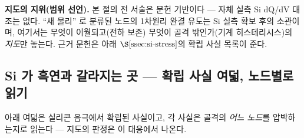 \begin{bgbox}
\textbf{지도의 지위(범위 선언).} 본 절의 전 서술은 문헌 기반이다 --- 자체 실측 Si dQ/dV 대조는 없다.
``새 물리'' 로 분류된 노드의 1차원리 완결 유도는 Si 실측 확보 후의 소관이며, 여기서는 무엇이
이월되고(전하 보존) 무엇이 골격 밖인가(기계 히스테리시스)의 \emph{지도}만 놓는다. 근거 문헌은 아래
$\S\ref{ssec:si-stress}$의 확립 사실 목록이 준다.
\end{bgbox}

\subsection{Si 가 흑연과 갈라지는 곳 --- 확립 사실 여덟, 노드별로 읽기}\label{ssec:si-stress}
아래 여덟은 실리콘 음극에서 확립된 사실이고, 각 사실은 골격의 \emph{어느 노드}를 압박하는지로 읽는다
--- 지도의 판정은 이 대응에서 나온다.

